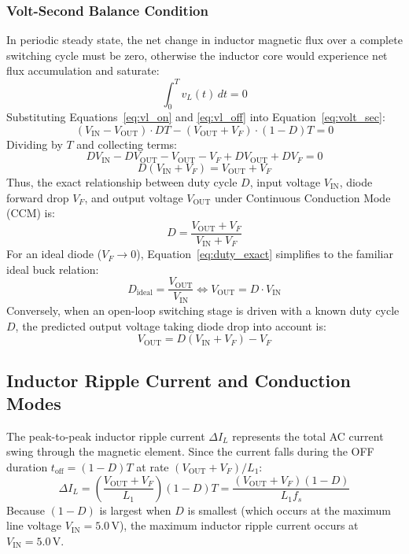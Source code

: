 \documentclass[12pt,a4paper]{article}
\newcommand{\Vout}{V_{\mathrm{OUT}}}
\newcommand{\Vin}{V_{\mathrm{IN}}}
\newcommand{\dI}{\Delta I_L}
\newcommand{\fs}{f_s}
\begin{document}
\subsubsection{Volt-Second Balance Condition}
In periodic steady state, the net change in inductor magnetic flux over a complete switching cycle must be zero, otherwise the inductor core would experience net flux accumulation and saturate:
\begin{equation}
    \int_{0}^{T} v_L(t)\,dt = 0
    \label{eq:volt_sec}
\end{equation}
Substituting Equations~\eqref{eq:vl_on} and \eqref{eq:vl_off} into Equation~\eqref{eq:volt_sec}:
\begin{equation}
    (\Vin - \Vout) \cdot D T - (\Vout + V_F) \cdot (1 - D) T = 0
\end{equation}
Dividing by $T$ and collecting terms:
\begin{equation}
    D \Vin - D \Vout - \Vout - V_F + D \Vout + D V_F = 0
\end{equation}
\begin{equation}
    D(\Vin + V_F) = \Vout + V_F
\end{equation}
Thus, the exact relationship between duty cycle $D$, input voltage $\Vin$, diode forward drop $V_F$, and output voltage $\Vout$ under Continuous Conduction Mode (CCM) is:
\begin{equation}
    D = \frac{\Vout + V_F}{\Vin + V_F}
    \label{eq:duty_exact}
\end{equation}
For an ideal diode ($V_F \to 0$), Equation~\eqref{eq:duty_exact} simplifies to the familiar ideal buck relation:
\begin{equation}
    D_{\mathrm{ideal}} = \frac{\Vout}{\Vin} \iff \Vout = D \cdot \Vin
    \label{eq:duty_ideal}
\end{equation}
Conversely, when an open-loop switching stage is driven with a known duty cycle $D$, the predicted output voltage taking diode drop into account is:
\begin{equation}
    \Vout = D(\Vin + V_F) - V_F
    \label{eq:vout_from_d}
\end{equation}

\subsection{Inductor Ripple Current and Conduction Modes}
The peak-to-peak inductor ripple current $\dI$ represents the total AC current swing through the magnetic element. Since the current falls during the OFF duration $t_{\mathrm{off}} = (1 - D)T$ at rate $(\Vout + V_F)/L_1$:
\begin{equation}
    \dI = \left(\frac{\Vout + V_F}{L_1}\right) (1 - D) T = \frac{(\Vout + V_F)(1 - D)}{L_1 \fs}
    \label{eq:ripple_current}
\end{equation}
Because $(1 - D)$ is largest when $D$ is smallest (which occurs at the maximum line voltage $\Vin = 5.0\,\mathrm{V}$), the maximum inductor ripple current occurs at $\Vin = 5.0\,\mathrm{V}$.
\end{document}
